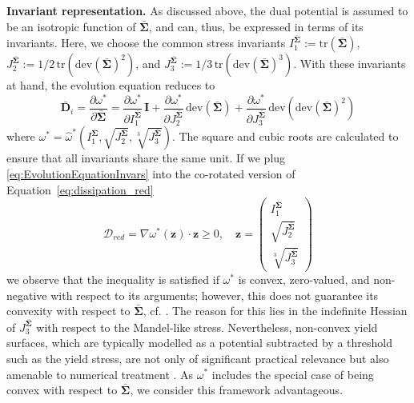 \textbf{Invariant representation.} As discussed above, the dual potential is assumed to be an isotropic function of $\bar{\bm{\Sigma}}$, and can, thus, be expressed in terms of its invariants.
Here, we choose the common stress invariants $I_1^{\bar{\bm{\Sigma}}}:=\mathrm{tr}(\bar{\bm{\Sigma}})$, $J_2^{\bar{\bm{\Sigma}}}:=1/2\,\mathrm{tr}(\mathrm{dev}(\bar{\bm{\Sigma}})^2)$, and $J_3^{\bar{\bm{\Sigma}}}:=1/3\,\mathrm{tr}(\mathrm{dev}(\bar{\bm{\Sigma}})^3)$.
With these invariants at hand, the evolution equation reduces to
%
\begin{equation}
    \bar{\bm{D}}_i = \frac{\partial\omega^*}{\partial\bar{\bm{\Sigma}}} = \frac{\partial\omega^*}{\partial I_1^{\bar{\bm{\Sigma}}}}\,\bm{I} + \frac{\partial\omega^*}{\partial J_2^{\bar{\bm{\Sigma}}}}\,\mathrm{dev}\left(\bar{\bm{\Sigma}}\right) + \frac{\partial\omega^*}{\partial J_3^{\bar{\bm{\Sigma}}}}\,\mathrm{dev}\left(\mathrm{dev}\left(\bar{\bm{\Sigma}}\right)^2\right)
\label{eq:EvolutionEquationInvars}
\end{equation}
%
where $\omega^*=\hat{\omega}^*\left(I_1^{\bar{\bm{\Sigma}}},\sqrt{J_2^{\bar{\bm{\Sigma}}}},\sqrt[3]{J_3^{\bar{\bm{\Sigma}}}}\right)$.
The square and cubic roots are calculated to ensure that all invariants share the same unit.
If we plug \eqref{eq:EvolutionEquationInvars} into the co-rotated version of Equation~\eqref{eq:dissipation_red}
%
\begin{equation}
    \mathcal{D}_{red} = \nabla\omega^*(\mathbf{z}) \cdot \mathbf{z} \geq 0, \quad \mathbf{z} = \begin{pmatrix}
        I_1^{\bar{\bm{\Sigma}}} \\
        \sqrt{J_2^{\bar{\bm{\Sigma}}}} \\
        \sqrt[3]{J_3^{\bar{\bm{\Sigma}}}}
    \end{pmatrix}
    \label{eq:reduced_dissipation_vector}
\end{equation}
%
we observe that the inequality is satisfied if $\omega^*$ is convex, zero-valued, and non-negative with respect to its arguments; however, this does not guarantee its convexity with respect to $\bar{\bm{\Sigma}}$, cf. \cite{collins2002}.
The reason for this lies in the indefinite Hessian of $J_3^{\bar{\bm{\Sigma}}}$ with respect to the Mandel-like stress.
Nevertheless, non-convex yield surfaces, which are typically modelled as a potential subtracted by a threshold such as the yield stress, are not only of significant practical relevance \cite{gluege2017,matzenmiller1995,baghous2022} but also amenable to numerical treatment \cite{sheng2011,pedroso2008}.
As $\omega^*$ includes the special case of being convex with respect to $\bar{\bm{\Sigma}}$, we consider this framework advantageous. 
%
